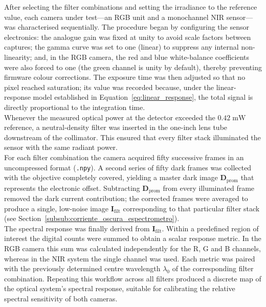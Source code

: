 

\noindent
After selecting the filter combinations and setting the irradiance to the reference value, each camera under test—an RGB unit and a monochannel NIR sensor—was characterised sequentially.  
The procedure began by configuring the sensor electronics: the analogue gain was fixed at unity to avoid scale factors between captures; the gamma curve was set to one (linear) to suppress any internal non-linearity; and, in the RGB camera, the red and blue white-balance coefficients were also forced to one (the green channel is unity by default), thereby preventing firmware colour corrections. The exposure time was then adjusted so that no pixel reached saturation; its value was recorded because, under the linear-response model established in Equation~\eqref{eq:linear_response}, the total signal is directly proportional to the integration time.\\


\noindent
Whenever the measured optical power at the detector exceeded the \(0.42\;\mathrm{mW}\) reference, a neutral-density filter was inserted in the one-inch lens tube downstream of the collimator.  
This ensured that every filter stack illuminated the sensor with the same radiant power.\\

\noindent
For each filter combination the camera acquired fifty successive frames in an uncompressed format (\texttt{.npy}).  
A second series of fifty dark frames was collected with the objective completely covered, yielding a master dark image \(\mathbf{D}_{\text{prom}}\) that represents the electronic offset.  
Subtracting \(\mathbf{D}_{\text{prom}}\) from every illuminated frame removed the dark current contribution; the corrected frames were averaged to produce a single, low-noise image \(\mathbf{I}_{\text{filt}}\) corresponding to that particular filter stack (see Section~\ref{subsub:corriente_oscura_espectrometro}). \\


\noindent
The spectral response was finally derived from \(\mathbf{I}_{\text{filt}}\).  
Within a predefined region of interest the digital counts were summed to obtain a scalar response metric.  
In the RGB camera this sum was calculated independently for the R, G and B channels, whereas in the NIR system the single channel was used.  
Each metric was paired with the previously determined centre wavelength \(\lambda_{0}\) of the corresponding filter combination.  
Repeating this workflow across all filters produced a discrete map of the optical system’s spectral response, suitable for calibrating the relative spectral sensitivity of both cameras.\\

